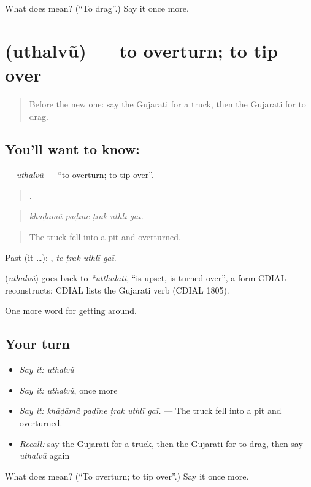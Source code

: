 \begin{tcolorbox}[breakable,colback=teal!4,colframe=teal!35!black,title={Before you move on}]
What does  mean? (\textquotedblleft{}To drag\textquotedblright{}.) Say it once more.
\end{tcolorbox}
\section[\texorpdfstring{\gu{ઉથલવું} (uthalvũ)}{ઉથલવું (uthalvũ)}]{ (uthalvũ) — to overturn; to tip over}

\label{lesson:GU-C401-uthalvu}



\begin{quote}
Before the new one: say the Gujarati for a truck, then the Gujarati for to drag.
\end{quote}

\subsection*{You'll want to know: }
\textbf{} — \emph{uthalvũ} — \textquotedblleft{}to overturn; to tip over\textquotedblright{}.

\begin{quote}
    .
\end{quote}

\begin{quote}
\emph{khāḍāmā̃ paḍīne ṭrak uthlī gaī.}
\end{quote}

\begin{quote}
The truck fell into a pit and overturned.
\end{quote}

Past (it …):    , \emph{te ṭrak uthlī gaī}.

\begin{cousinweb}
\textbf{} (\emph{uthalvũ}) goes back to \emph{*utthalati}, \textquotedblleft{}is upset, is turned over\textquotedblright{}, a form CDIAL reconstructs; CDIAL lists the Gujarati verb (CDIAL 1805).
\end{cousinweb}

\begin{grammarlens}[title={What you've built}]
One more word for getting around.
\end{grammarlens}

\subsection*{Your turn}
\begin{itemize}
\raggedright
  \item \emph{Say it:} \emph{uthalvũ}
  \item \emph{Say it:} \emph{uthalvũ}, once more
  \item \emph{Say it:} \emph{khāḍāmā̃ paḍīne ṭrak uthlī gaī.} — The truck fell into a pit and overturned.
  \item \emph{Recall:} say the Gujarati for a truck, then the Gujarati for to drag, then say \emph{uthalvũ} again
\end{itemize}

\begin{tcolorbox}[breakable,colback=teal!4,colframe=teal!35!black,title={Before you move on}]
What does  mean? (\textquotedblleft{}To overturn; to tip over\textquotedblright{}.) Say it once more.
\end{tcolorbox}

